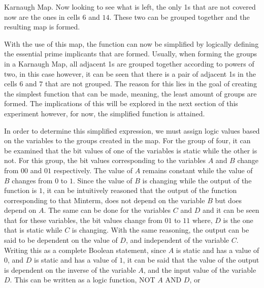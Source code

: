 \documentclass[12pt]{article}
\begin{document}
    Karnaugh Map. Now looking to see what is left, the only 1s that are not
    covered now are the ones in cells $6$ and $14$. These two can be grouped
    together and the resulting map is formed.
    \begin{center}
    \end{center}
    \par With the use of this map, the function can now be simplified by
    logically defining the essential prime implicants that are formed. Usually,
    when forming the groups in a Karnaugh Map, all adjacent 1s are grouped
    together according to powers of two, in this case however, it can be seen
    that there is a pair of adjacent 1s in the cells $6$ and $7$ that are not
    grouped. The reason for this lies in the goal of creating the simplest
    function that can be made, meaning, the least amount of groups are formed.
    The implications of this will be explored in the next section of this
    experiment however, for now, the simplified function is attained.
    \par In order to determine this simplified expression, we must assign logic
    values based on the variables to the groups created in the map. For the
    group of four, it can be examined that the bit values of one of the
    variables is static while the other is not. For this group, the bit values
    corresponding to the variables $A$ and $B$ change from $00$ and $01$
    respectively. The value of $A$ remains constant while the value of $B$
    changes from $0$ to $1$. Since the value of $B$ is changing while the output
    of the function is $1$, it can be intuitively reasoned that the output of
    the function corresponding to that Minterm, does not depend on the variable
    $B$ but does depend on $A$. The same can be done for the variables $C$ and
    $D$ and it can be seen that for these variables, the bit values change from
    $01$ to $11$ where, $D$ is the one that is static while $C$ is changing.
    With the same reasoning, the output can be said to be dependent on the value
    of $D$, and independent of the variable $C$. Writing this as a complete
    Boolean statement, since $A$ is static and has a value of $0$, and $D$ is
    static and has a value of $1$, it can be said that the value of the output
    is dependent on the inverse of the variable $A$, and the input value of the
    variable $D$. This can be written as a logic function, NOT $A$ AND $D$, or
\end{document}
